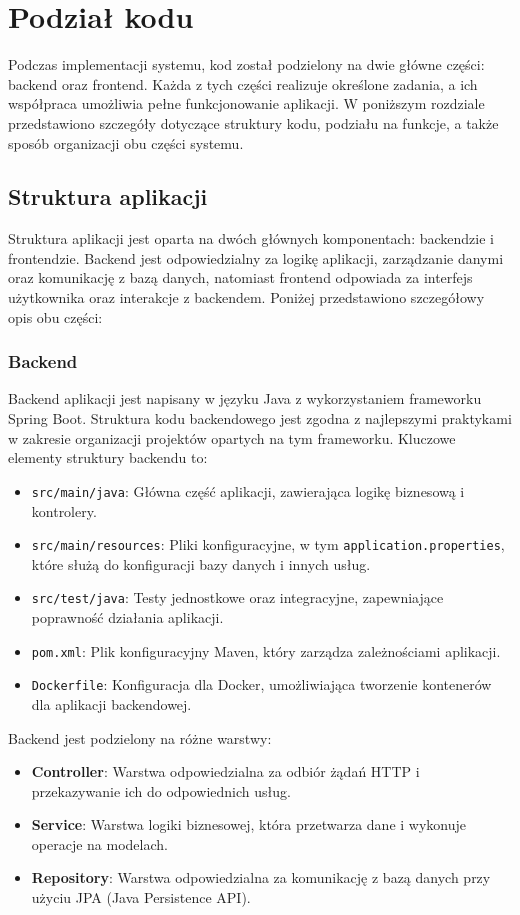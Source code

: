 \section{Podział kodu}

Podczas implementacji systemu, kod został podzielony na dwie główne części: backend oraz frontend. Każda z tych części realizuje określone zadania, a ich współpraca umożliwia pełne funkcjonowanie aplikacji. W poniższym rozdziale przedstawiono szczegóły dotyczące struktury kodu, podziału na funkcje, a także sposób organizacji obu części systemu.

\subsection{Struktura aplikacji}

Struktura aplikacji jest oparta na dwóch głównych komponentach: backendzie i frontendzie. Backend jest odpowiedzialny za logikę aplikacji, zarządzanie danymi oraz komunikację z bazą danych, natomiast frontend odpowiada za interfejs użytkownika oraz interakcje z backendem. Poniżej przedstawiono szczegółowy opis obu części:

\subsubsection{Backend}
Backend aplikacji jest napisany w języku Java z wykorzystaniem frameworku Spring Boot. Struktura kodu backendowego jest zgodna z najlepszymi praktykami w zakresie organizacji projektów opartych na tym frameworku. Kluczowe elementy struktury backendu to:
\begin{itemize}
    \item \texttt{src/main/java}: Główna część aplikacji, zawierająca logikę biznesową i kontrolery.
    \item \texttt{src/main/resources}: Pliki konfiguracyjne, w tym \texttt{application.properties}, które służą do konfiguracji bazy danych i innych usług.
    \item \texttt{src/test/java}: Testy jednostkowe oraz integracyjne, zapewniające poprawność działania aplikacji.
    \item \texttt{pom.xml}: Plik konfiguracyjny Maven, który zarządza zależnościami aplikacji.
    \item \texttt{Dockerfile}: Konfiguracja dla Docker, umożliwiająca tworzenie kontenerów dla aplikacji backendowej.
\end{itemize}

Backend jest podzielony na różne warstwy:
\begin{itemize}
    \item \textbf{Controller}: Warstwa odpowiedzialna za odbiór żądań HTTP i przekazywanie ich do odpowiednich usług.
    \item \textbf{Service}: Warstwa logiki biznesowej, która przetwarza dane i wykonuje operacje na modelach.
    \item \textbf{Repository}: Warstwa odpowiedzialna za komunikację z bazą danych przy użyciu JPA (Java Persistence API).
\end{itemize}

